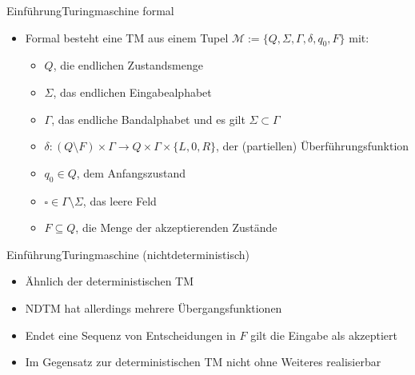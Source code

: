 \documentclass[ignorenonframetext,]{beamer}
\begin{document}
\begin{frame}{Einführung}{Turingmaschine formal}

\begin{itemize}
\itemsep1pt\parskip0pt
\item
  Formal besteht eine TM aus einem Tupel
  $\mathcal{M}:=\{ Q, \Sigma, \Gamma, \delta, q_0, F \}$ mit:

  \begin{itemize}
  \itemsep1pt\parskip0pt
  \item
    $Q$, die endlichen Zustandsmenge
  \item
    $\Sigma$, das endlichen Eingabealphabet
  \item
    $\Gamma$, das endliche Bandalphabet und es gilt
    $\Sigma \subset \Gamma$
  \item
    $\delta\colon (Q \setminus F)\times \Gamma \to Q \times \Gamma \times \{L, 0, R\}$,
    der (partiellen) Überführungsfunktion
  \item
    $q_0 \in Q$, dem Anfangszustand
  \item
    $\square \in \Gamma\setminus\Sigma$, das leere Feld
  \item
    $F \subseteq Q$, die Menge der akzeptierenden Zustände
  \end{itemize}
\end{itemize}

\end{frame}

\begin{frame}{Einführung}{Turingmaschine (nichtdeterministisch)}

\begin{itemize}
\itemsep1pt\parskip0pt
\item
  Ähnlich der deterministischen TM
\item
  NDTM hat allerdings mehrere Übergangsfunktionen
\item
  Endet eine Sequenz von Entscheidungen in $F$ gilt die Eingabe als
  akzeptiert
\item
  Im Gegensatz zur deterministischen TM nicht ohne Weiteres realisierbar
\end{itemize}

\end{frame}
\end{document}
